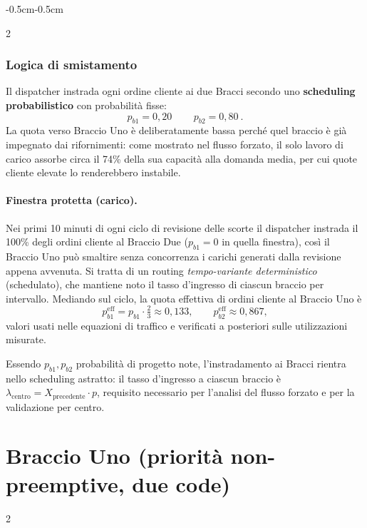 \documentclass{article}
\newcommand{\beforesectiongap}{\vspace*{\baselineskip}}
\begin{document}
\begin{adjustwidth}{-0.5cm}{-0.5cm}
\begin{multicols}{2}
\subsubsection*{Logica di smistamento}
Il dispatcher instrada ogni ordine cliente ai due Bracci secondo uno \textbf{scheduling
probabilistico} con probabilità fisse:
\[
p_{b1} = 0{,}20 \, \qquad p_{b2} = 0{,}80 \ .
\]
La quota verso Braccio Uno è deliberatamente bassa perché quel braccio è già impegnato dai
rifornimenti: come mostrato nel flusso forzato, il solo lavoro di carico assorbe circa il 74\%
della sua capacità alla domanda media, per cui quote cliente elevate lo renderebbero instabile.

\paragraph{Finestra protetta (carico).} Nei primi 10 minuti di ogni ciclo di revisione
delle scorte il dispatcher instrada il 100\% degli ordini cliente al Braccio
Due ($p_{b1}=0$ in quella finestra), così il Braccio Uno può smaltire senza concorrenza i carichi
generati dalla revisione appena avvenuta. Si tratta di un routing \emph{tempo-variante
deterministico} (schedulato), che mantiene noto il tasso d'ingresso di ciascun braccio per
intervallo. Mediando sul ciclo, la quota effettiva di ordini cliente al Braccio Uno è
\[
p_{b1}^{\text{eff}} = p_{b1}\cdot\tfrac{2}{3} \approx 0{,}133, \qquad
p_{b2}^{\text{eff}} \approx 0{,}867,
\]
valori usati nelle equazioni di traffico e verificati a posteriori sulle utilizzazioni misurate.

Essendo $p_{b1},p_{b2}$ probabilità di progetto note, l'instradamento ai Bracci rientra nello
scheduling astratto: il tasso d'ingresso a ciascun braccio è $\lambda_{\text{centro}} =
X_{\text{precedente}}\cdot p$, requisito necessario per l'analisi del flusso forzato e per la
validazione per centro.
\end{multicols}
\beforesectiongap

\section*{Braccio Uno (priorità non-preemptive, due code)}
\begin{multicols}{2}


\end{multicols}
\end{adjustwidth}
\end{document}
